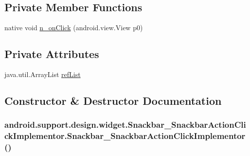 \subsection*{Private Member Functions}
\begin{CompactItemize}
\item 
native void \hyperlink{classandroid_1_1support_1_1design_1_1widget_1_1_snackbar___snackbar_action_click_implementor_c8eb6219e2bc866658fd3a8157c68bb8}{n\_\-onClick} (android.view.View p0)
\end{CompactItemize}
\subsection*{Private Attributes}
\begin{CompactItemize}
\item 
java.util.ArrayList \hyperlink{classandroid_1_1support_1_1design_1_1widget_1_1_snackbar___snackbar_action_click_implementor_2c212a55ca2a8eb41a261abf32790343}{refList}
\end{CompactItemize}


\subsection{Constructor \& Destructor Documentation}
\hypertarget{classandroid_1_1support_1_1design_1_1widget_1_1_snackbar___snackbar_action_click_implementor_1d392f4895434ec586991a7b29333721}{
\subsubsection[{Snackbar\_\-SnackbarActionClickImplementor}]{\setlength{\rightskip}{0pt plus 5cm}android.support.design.widget.Snackbar\_\-SnackbarActionClickImplementor.Snackbar\_\-SnackbarActionClickImplementor ()}}
\label{classandroid_1_1support_1_1design_1_1widget_1_1_snackbar___snackbar_action_click_implementor_1d392f4895434ec586991a7b29333721}




